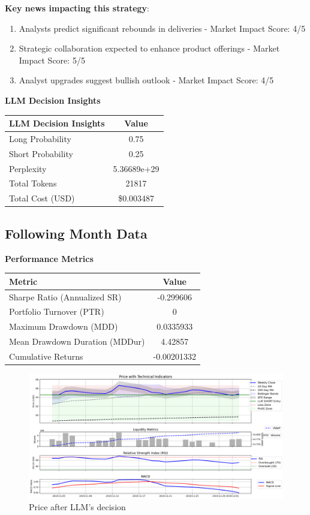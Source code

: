 \documentclass[8pt]{scrartcl}
\begin{document}
\textbf{Key news impacting this strategy}:
\begin{enumerate}
    \item Analysts predict significant rebounds in deliveries - Market Impact Score: 4/5
    \item Strategic collaboration expected to enhance product offerings - Market Impact Score: 5/5
    \item Analyst upgrades suggest bullish outlook - Market Impact Score: 4/5
\end{enumerate}

\textbf{LLM Decision Insights}

\begin{longtable}{l c}
\toprule
\textbf{LLM Decision Insights} & \textbf{Value} \\
\midrule
Long Probability & 0.75 \\
Short Probability & 0.25 \\
Perplexity & 5.36689e+29 \\
\midrule
Total Tokens & 21817 \\
Total Cost (USD) & \$0.003487 \\
\bottomrule
\end{longtable}

\subsection*{Following Month Data}

\textbf{Performance Metrics}

\begin{longtable}{l c}
\toprule
\textbf{Metric} & \textbf{Value} \\
\midrule
Sharpe Ratio (Annualized SR) & -0.299606 \\
Portfolio Turnover (PTR) & 0 \\
Maximum Drawdown (MDD) & 0.0335933 \\
Mean Drawdown Duration (MDDur) & 4.42857 \\
Cumulative Returns & -0.00201332 \\
\bottomrule
\end{longtable}

\begin{figure}[H]
    \centering
    \includegraphics[width=1\linewidth]{judge_reviews//GOOGL_M_gpt-4o-mini/2019-11-04/llm_Price_with_Technical_Indicators.png}
    \caption{Price after LLM's decision}
\end{figure}
\end{document}
